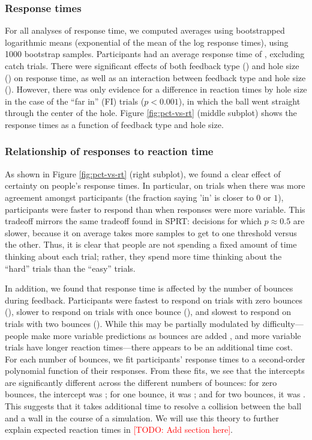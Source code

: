 \documentclass[10pt,letterpaper]{article}
\newcommand{\TODO}[1]{\textcolor{red}{[TODO: #1]}}
\begin{document}
\subsubsection{Response times}

For all analyses of response time, we computed averages using bootstrapped logarithmic means (exponential of the mean of the log response times), using 1000 bootstrap samples. Participants had an average response time of \AvgRT{}, excluding catch trials. There were significant effects of both feedback type (\RTHoleClass{}) and hole size (\RTHoleSize{}) on response time, as well as an interaction between feedback type and hole size (\RTFull{}). However, there was only evidence for a difference in reaction times by hole size in the case of the ``far in'' (FI) trials ($p<0.001$), in which the ball went straight through the center of the hole. Figure \ref{fig:pct-vs-rt} (middle subplot) shows the response times as a function of feedback type and hole size.

\subsubsection{Relationship of responses to reaction time}

As shown in Figure \ref{fig:pct-vs-rt} (right subplot), we found a clear effect of certainty on people's response times. In particular, on trials when there was more agreement amongst participants (the fraction saying 'in' is closer to $0$ or $1$), participants were faster to respond than when responses were more variable. This tradeoff mirrors the same tradeoff found in SPRT: decisions for which $p\approx0.5$ are slower, because it on average takes more samples to get to one threshold versus the other. Thus, it is clear that people are not spending a fixed amount of time thinking about each trial; rather, they spend more time thinking about the ``hard'' trials than the ``easy'' trials.

In addition, we found that response time is affected by the number of bounces during feedback. Participants were fastest to respond on trials with zero bounces (\RTZeroBounces{}), slower to respond on trials with once bounce (\RTOneBounces{}), and slowest to respond on trials with two bounces (\RTTwoBounces{}). While this may be partially modulated by difficulty---people make more variable predictions as bounces are added \cite{Smith:2013fc}, and more variable trials have longer reaction times---there appears to be an additional time cost. For each number of bounces, we fit participants' response times to a second-order polynomial function of their responses. From these fits, we see that the intercepts are significantly different across the different numbers of bounces: for zero bounces, the intercept was \InterceptZeroBounces{}; for one bounce, it was \InterceptOneBounces{}; and for two bounces, it was \InterceptTwoBounces{}. This suggests that it takes additional time to resolve a collision between the ball and a wall in the course of a simulation. We will use this theory to further explain expected reaction times in \TODO{Add section here}.
\end{document}
